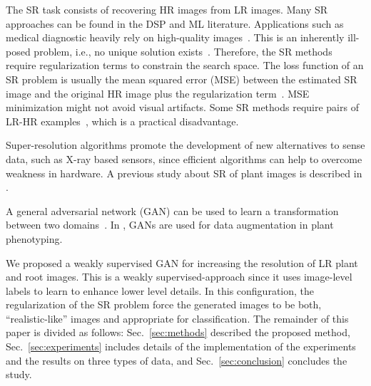 \documentclass[10pt,twocolumn,letterpaper]{article}
\begin{document}
The SR task consists of recovering HR images from LR images. Many SR approaches can be found in the DSP and ML literature. Applications such as medical diagnostic heavily rely on high-quality images~\cite{Zhang2012}. This is an inherently ill-posed problem, i.e., no unique solution exists~\cite{Hui2018}. Therefore, the SR methods require regularization terms to constrain the search space. The loss function of an SR problem is usually the mean squared error (MSE) between the estimated SR image and the original HR image plus the regularization term~\cite{Ledig2017}. MSE minimization might not avoid visual artifacts. Some SR methods require pairs of LR-HR examples~\cite{Zeyde2012}, which is a practical disadvantage.

Super-resolution algorithms promote the development of new alternatives to sense data, such as X-ray based sensors, since efficient algorithms can help to overcome weakness in hardware. A previous study about SR of plant images is described in \cite{Yamamoto2017}.


A general adversarial network (GAN) can be used to learn a transformation between two domains~\cite{Hong2018}. In \cite{Giuffrida2017}, GANs are used for data augmentation in plant phenotyping.


We proposed a weakly supervised GAN for increasing the resolution of LR plant and root images. This is a weakly supervised-approach since it uses image-level labels to learn to enhance lower level details. In this configuration, the regularization of the SR problem force the generated images to be both, ``realistic-like'' images and appropriate for classification. The remainder of this paper is divided as follows: Sec.~\ref{sec:methods} described the proposed method, Sec.~\ref{sec:experiments} includes details of the implementation of the experiments and the results on three types of data, and Sec.~\ref{sec:conclusion} concludes the study.

\end{document}
